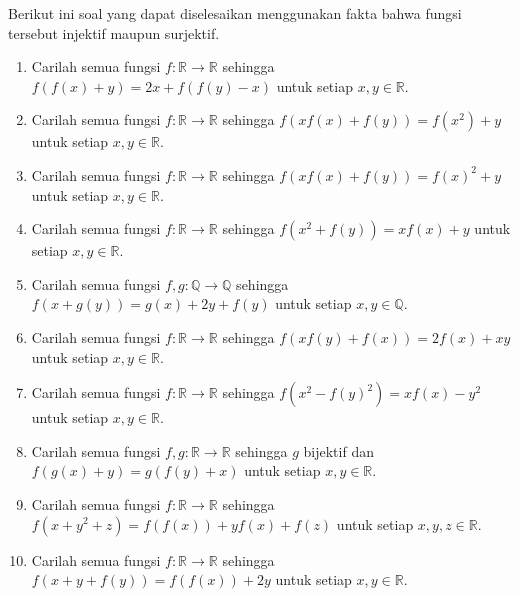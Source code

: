 \documentclass{article}
\begin{document}
Berikut ini soal yang dapat diselesaikan menggunakan fakta bahwa fungsi tersebut injektif maupun surjektif.
\begin{enumerate}
\item Carilah semua fungsi $f : \mathbb{R} \rightarrow \mathbb{R}$ sehingga $f(f(x)+y) = 2x + f(f(y)-x)$ untuk setiap $x, y \in \mathbb{R}$.
\item Carilah semua fungsi $f : \mathbb{R} \rightarrow \mathbb{R}$ sehingga $f(x f(x) + f(y)) = f(x^2) + y$ untuk setiap $x, y \in \mathbb{R}$.
\item Carilah semua fungsi $f : \mathbb{R} \rightarrow \mathbb{R}$ sehingga $f(x f(x) + f(y)) = f(x)^2 + y$ untuk setiap $x, y \in \mathbb{R}$.
\item Carilah semua fungsi $f : \mathbb{R} \rightarrow \mathbb{R}$ sehingga $f(x^2 + f(y)) = x f(x) + y$ untuk setiap $x, y \in \mathbb{R}$.
\item Carilah semua fungsi $f, g : \mathbb{Q} \rightarrow \mathbb{Q}$ sehingga $f(x+g(y)) = g(x) + 2y + f(y)$ untuk setiap $x, y \in \mathbb{Q}$.
\end{enumerate}



\begin{enumerate}
\setcounter{enumi}{5}
\item Carilah semua fungsi $f : \mathbb{R} \rightarrow \mathbb{R}$ sehingga $f(x f(y) + f(x)) = 2f(x) + xy$ untuk setiap $x, y \in \mathbb{R}$.
\item Carilah semua fungsi $f : \mathbb{R} \rightarrow \mathbb{R}$ sehingga $f(x^2 - f(y)^2) = x f(x) - y^2$ untuk setiap $x, y \in \mathbb{R}$.
\item Carilah semua fungsi $f, g : \mathbb{R} \rightarrow \mathbb{R}$ sehingga $g$ bijektif dan $f(g(x)+y) = g(f(y)+x)$ untuk setiap $x, y \in \mathbb{R}$.
\item Carilah semua fungsi $f : \mathbb{R} \rightarrow \mathbb{R}$ sehingga $f(x+y^2+z) = f(f(x)) + y f(x) + f(z)$ untuk setiap $x, y, z \in \mathbb{R}$.
\item Carilah semua fungsi $f : \mathbb{R} \rightarrow \mathbb{R}$ sehingga $f(x+y+f(y)) = f(f(x)) + 2y$ untuk setiap $x, y \in \mathbb{R}$.
\end{enumerate}
\end{document}
